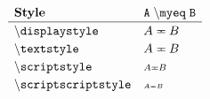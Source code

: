 \documentclass[varwidth, border = 3pt]{standalone}
\newcommand{\test}%
           {A \myeq B}
\newcommand{\verbtest}%
           {A \mathmacro{myeq} B}
\newcommand{\testmathstyle}{
  \[
    \renewcommand{\arraystretch}{1.2}%
    \begin{array}{lll}
        \textbf{Style}
      & \mathtt{\verbtest}
      \\ \hline
        \mathtt{\backslash displaystyle}
      & \displaystyle \test
      \\
        \mathtt{\backslash textstyle}
      & \textstyle \test
      \\
        \mathtt{\backslash scriptstyle}
      & \scriptstyle \test
      \\
        \mathtt{\backslash scriptscriptstyle}
      & \scriptscriptstyle \test
    \end{array}
  \]
}
\begin{document}
\testmathstyle
\end{document}
